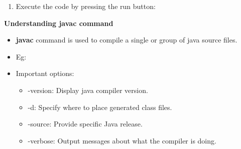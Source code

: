 \begin{flushleft}
\begin{itemize}
\begin{enumerate}
				\item Execute the code by pressing the run button:
				
				
			\end{enumerate}

		\end{itemize}
	
		\newpage
		\textbf{Understanding javac command}
		\begin{itemize}
			\item \textbf{javac} command is used to compile a single or group of java source files.
			\bigskip
			\item Eg:
			\bigskip
			\item Important options:
			\begin{itemize}
				\item -version: Display java compiler version.
				\bigskip
				\item -d: Specify where to place generated class files.
				\bigskip
				\item -source: Provide specific Java release.
				\bigskip
			
				\newpage
				\item -verbose: Output messages about what the compiler is doing.
				\bigskip
			\end{itemize}
		\end{itemize}
			

\end{flushleft}
